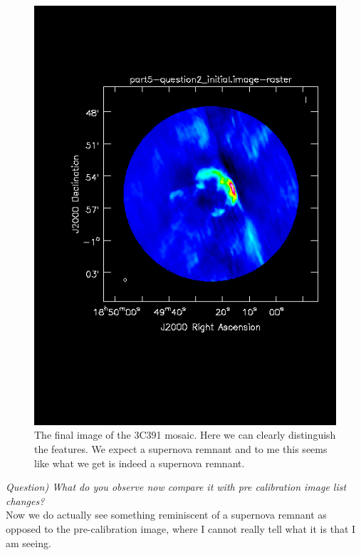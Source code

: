 \documentclass[12pt, a4paper]{article}
\begin{document}
\begin{figure}[h!]
    \centering
    \includegraphics[scale=1]{../Imaging/plots2/postcal.png}
    \caption{The final image of the 3C391 mosaic. Here we can clearly distinguish the features. We expect a supernova remnant and to me this seems like what we get is indeed a supernova remnant. \label{fig:postcal}}
\end{figure}

\noindent \textit{Question) What do you observe now compare it with pre calibration image list changes?} \\
Now we do actually see something reminiscent of a supernova remnant as opposed to the pre-calibration image, where I cannot really tell what it is that I am seeing.
\end{document}
